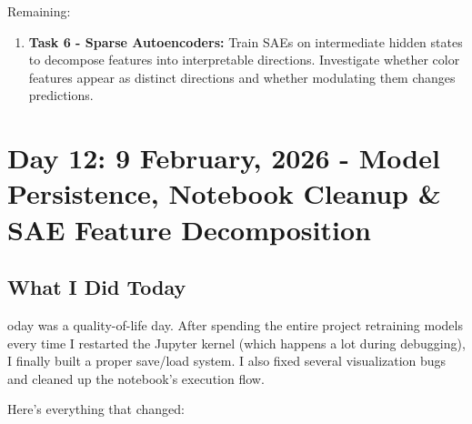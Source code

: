 \documentclass[9pt,a4paper,twocolumn,twoside]{tau-class/tau}
\begin{document}
        Remaining:
        \begin{enumerate}
            \item \textbf{Task 6 - Sparse Autoencoders:} Train SAEs on intermediate hidden states to decompose features into interpretable directions. Investigate whether color features appear as distinct directions and whether modulating them changes predictions.
        \end{enumerate}


\section{Day 12: 9 February, 2026 - Model Persistence, Notebook Cleanup \& SAE Feature Decomposition}

    \subsection{What I Did Today}

        oday was a quality-of-life day. After spending the entire project retraining models every time I restarted the Jupyter kernel (which happens a lot during debugging), I finally built a proper save/load system. I also fixed several visualization bugs and cleaned up the notebook's execution flow.

        Here's everything that changed:
\end{document}
